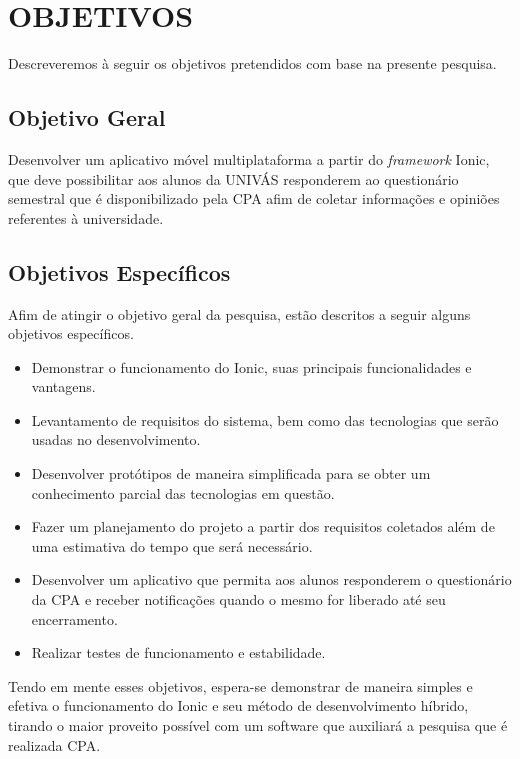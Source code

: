\chapter{OBJETIVOS}

	\par Descreveremos à seguir os objetivos pretendidos com base na presente pesquisa.

\section{Objetivo Geral}

	\par Desenvolver um aplicativo móvel multiplataforma a partir do \textit{framework} Ionic, que deve possibilitar aos alunos da UNIVÁS responderem ao questionário semestral que é disponibilizado pela CPA afim de coletar informações e opiniões referentes à universidade.

\section{Objetivos Específicos}

	\par Afim de atingir o objetivo geral da pesquisa, estão descritos a seguir alguns objetivos específicos.
	\begin{itemize}
		\item Demonstrar o funcionamento do Ionic, suas principais funcionalidades e vantagens.
		\item Levantamento de requisitos do sistema, bem como das tecnologias que serão usadas no desenvolvimento.
		\item Desenvolver protótipos de maneira simplificada para se obter um conhecimento parcial das tecnologias em questão.
		\item Fazer um planejamento do projeto a partir dos requisitos coletados além de uma estimativa do tempo que será necessário.
		\item Desenvolver um aplicativo que permita aos alunos responderem o questionário da CPA e receber notificações quando o mesmo for liberado até seu encerramento.
		\item Realizar testes de funcionamento e estabilidade.
	\end{itemize}
	\par Tendo em mente esses objetivos, espera-se demonstrar de maneira simples e efetiva o funcionamento do Ionic e seu método de desenvolvimento híbrido, tirando o maior proveito possível com um software que auxiliará a pesquisa que é realizada CPA.

